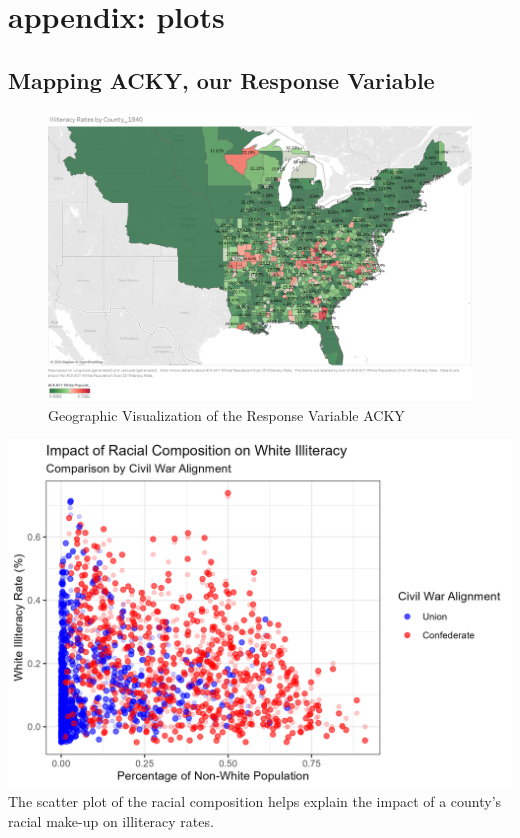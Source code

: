 \documentclass[a4paper,12pt]{article}
\begin{document}
\section{appendix: plots}
\label{appendix:}

\subsection{Mapping ACKY, our Response Variable}
\begin{landscape}
\thispagestyle{empty} %
\begin{figure}[p] %
    \centering
    \includegraphics[width=\linewidth,height=\textheight,keepaspectratio]{IlliteracyRatesByCounty_1840.png}
    \caption{Geographic Visualization of the Response Variable ACKY}
    \label{fig:landscape_image}
\end{figure}
\end{landscape}


\includegraphics[scale=1]{ACSP.png}
\newline
The scatter plot of the racial composition helps explain the impact of a county's racial make-up on illiteracy rates.\* 
\end{document}
